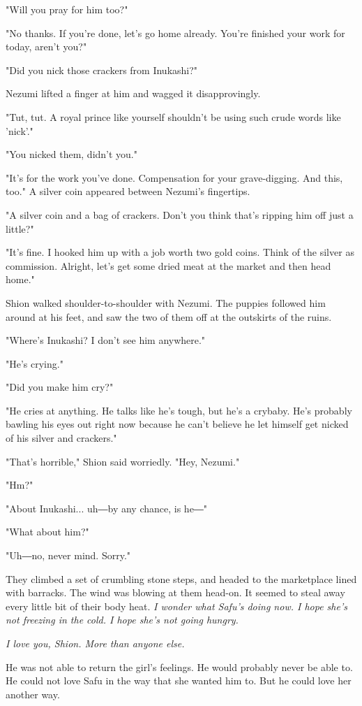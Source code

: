 "Will you pray for him too?"

"No thanks. If you're done, let's go home already. You're finished your
work for today, aren't you?"

"Did you nick those crackers from Inukashi?"

Nezumi lifted a finger at him and wagged it disapprovingly.

"Tut, tut. A royal prince like yourself shouldn't be using such crude
words like 'nick'."

"You nicked them, didn't you."

"It's for the work you've done. Compensation for your grave-digging. And
this, too." A silver coin appeared between Nezumi's fingertips.

"A silver coin and a bag of crackers. Don't you think that's ripping him
off just a little?"

"It's fine. I hooked him up with a job worth two gold coins. Think of
the silver as commission. Alright, let's get some dried meat at the
market and then head home."

Shion walked shoulder-to-shoulder with Nezumi. The puppies followed him
around at his feet, and saw the two of them off at the outskirts of the
ruins.

"Where's Inukashi? I don't see him anywhere."

"He's crying."

"Did you make him cry?"

"He cries at anything. He talks like he's tough, but he's a crybaby.
He's probably bawling his eyes out right now because he can't believe he
let himself get nicked of his silver and crackers."

"That's horrible," Shion said worriedly. "Hey, Nezumi."

"Hm?"

"About Inukashi... uh―by any chance, is he―"

"What about him?"

"Uh―no, never mind. Sorry."

They climbed a set of crumbling stone steps, and headed to the
marketplace lined with barracks. The wind was blowing at them head-on.
It seemed to steal away every little bit of their body heat. \emph{I wonder
what Safu's doing now. I hope she's not freezing in the cold. I hope
she's not going hungry.}

\emph{I love you, Shion. More than anyone else.}

He was not able to return the girl's feelings. He would probably never
be able to. He could not love Safu in the way that she wanted him to.
But he could love her another way.

